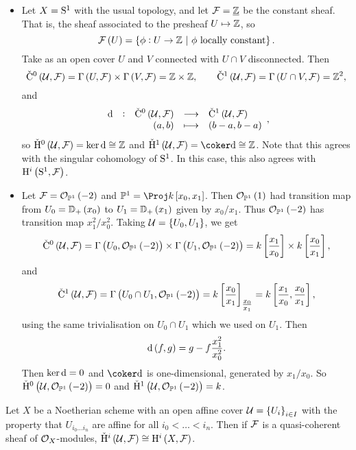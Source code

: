 \begin{example*}
\hfill
\begin{itemize}
\item Let $ X = \S^1 $ with the usual topology, and let $ \FFF = \underline{\ZZ} $ be the constant sheaf. That is, the sheaf associated to the presheaf $ U \mapsto \ZZ $, so
$$ \FFF\br{U} = \cbr{\phi : U \to \ZZ \st \phi \ \text{locally constant}}. $$
Take as an open cover $ U $ and $ V $ connected with $ U \cap V $ disconnected. Then
$$ \vC^0\br{\UUU, \FFF} = \Gamma\br{U, \FFF} \times \Gamma\br{V, \FFF} = \ZZ \times \ZZ, \qquad \vC^1\br{\UUU, \FFF} = \Gamma\br{U \cap V, \FFF} = \ZZ^2, $$
and
$$ \function[\d]{\vC^0\br{\UUU, \FFF}}{\vC^1\br{\UUU, \FFF}}{\br{a, b}}{\br{b - a, b - a}}, $$
so $ \vH^0\br{\UUU, \FFF} = \ker \d \cong \ZZ $ and $ \vH^1\br{\UUU, \FFF} = \coker \d \cong \ZZ $. Note that this agrees with the singular cohomology of $ \S^1 $. In this case, this also agrees with $ \H^i\br{\S^1, \FFF} $.
\item Let $ \FFF = \OOO_{\PP^1}\br{-2} $ and $ \PP^1 = \Proj k\sbr{x_0, x_1} $. Then $ \OOO_{\PP^1}\br{1} $ had transition map from $ U_0 = \DD_+\br{x_0} $ to $ U_1 = \DD_+\br{x_1} $ given by $ x_0 / x_1 $. Thus $ \OOO_{\PP^1}\br{-2} $ has transition map $ x_1^2 / x_0^2 $. Taking $ \UUU = \cbr{U_0, U_1} $, we get
$$ \vC^0\br{\UUU, \FFF} = \Gamma\br{U_0, \OOO_{\PP^1}\br{-2}} \times \Gamma\br{U_1, \OOO_{\PP^1}\br{-2}} = k\sbr{\dfrac{x_1}{x_0}} \times k\sbr{\dfrac{x_0}{x_1}}, $$
and
$$ \vC^1\br{\UUU, \FFF} = \Gamma\br{U_0 \cap U_1, \OOO_{\PP^1}\br{-2}} = k\sbr{\dfrac{x_0}{x_1}}_{\tfrac{x_0}{x_1}} = k\sbr{\dfrac{x_1}{x_0}, \dfrac{x_0}{x_1}}, $$
using the same trivialisation on $ U_0 \cap U_1 $ which we used on $ U_1 $. Then
$$ \d\br{f, g} = g - f\dfrac{x_1^2}{x_0^2}. $$
Then $ \ker \d = 0 $ and $ \coker \d $ is one-dimensional, generated by $ x_1 / x_0 $. So $ \vH^0\br{\UUU, \OOO_{\PP^1}\br{-2}} = 0 $ and $ \vH^1\br{\UUU, \OOO_{\PP^1}\br{-2}} = k $.
\end{itemize}
\end{example*}

\begin{theorem}
Let $ X $ be a Noetherian scheme with an open affine cover $ \UUU = \cbr{U_i}_{i \in I} $ with the property that $ U_{i_0 \dots i_n} $ are affine for all $ i_0 < \dots < i_n $. Then if $ \FFF $ is a quasi-coherent sheaf of $ \OOO_X $-modules, $ \vH^i\br{\UUU, \FFF} \cong \H^i\br{X, \FFF} $.
\end{theorem}


